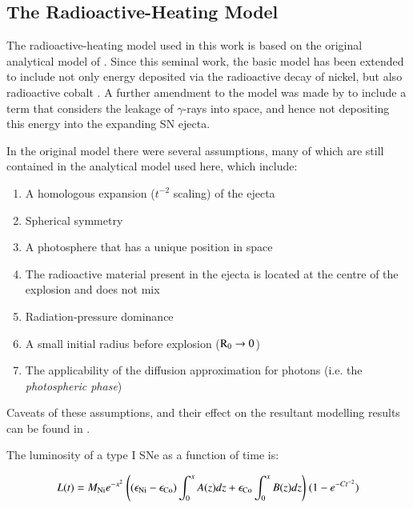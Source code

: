 \documentclass[traditabstract,longauth]{aa}
\begin{document}
\begin{appendix}



\section{The Radioactive-Heating Model}
\label{sec:app_radioactive}

The radioactive-heating model used in this work is based on the original analytical model of \citet{Arnett1982}.  Since this seminal work, the basic model has been extended to include not only energy deposited via the radioactive decay of nickel, but also radioactive cobalt \citep{Valenti08}.  A further amendment to the model was made by \citet{Chatzopoulos11} to include a term that considers the leakage of $\gamma$-rays into space, and hence not depositing this energy into the expanding SN ejecta.

In the original \citet{Arnett1982} model there were several assumptions, many of which are still contained in the analytical model used here, which include:

\begin{enumerate}
\item A homologous expansion ($t^{-2}$ scaling) of the ejecta
\item Spherical symmetry
\item A photosphere that has a unique position in space
\item The radioactive material present in the ejecta is located at the centre of the explosion and does not mix
\item Radiation-pressure dominance
\item A small initial radius before explosion ($\rm{R_{0}} \rightarrow 0$)
\item The applicability of the diffusion approximation for photons (i.e. the \emph{photospheric phase})
\end{enumerate}

Caveats of these assumptions, and their effect on the resultant modelling results can be found in \citet{Cano13}.


The luminosity of a type I SNe as a function of time is:

\begin{footnotesize}
\begin{center}
\begin{equation}
\label{equ:bol1}
 L(t) = M_{\rm Ni}e^{-x^2}~{\left((\epsilon_{\rm Ni} - \epsilon_{\rm Co}) \int_{0}^{x}A(z)dz+ \epsilon_{\rm Co}\int_{0}^{x}B(z)dz\right)}~(1-e^{-Ct^{-2}})
\end{equation} 
\end{center}
\end{footnotesize}


\end{appendix}
\end{document}
